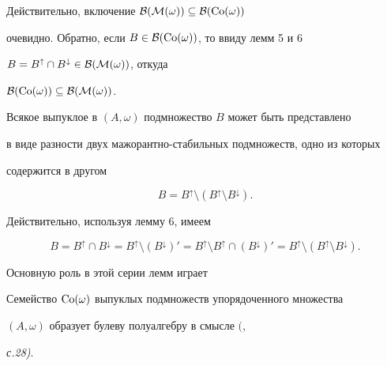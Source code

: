  


Действительно, включение $\cal B(M(\omega))\subseteq\cal B(\operatorname{Co}(\omega))$ 


очевидно. Обратно, если $B\in\cal B(\operatorname{Co}(\omega))$, то ввиду лемм 5 и 6\; 


$B=B^\uparrow\cap B^\downarrow\in\cal B(M(\omega))$, откуда 


$\cal B(\operatorname{Co}(\omega))\subseteq\cal B(M(\omega))$. 


 


\begin{cor} 


Всякое выпуклое в $(A,\omega)$ подмножество $B$ может быть представлено 


в виде разности двух мажорантно-стабильных подмножеств, одно из которых 


содержится в другом


\begin{equation} 


B=B^\uparrow\setminus(B^\uparrow\setminus 


B^\downarrow). 


\end{equation} 


\end{cor} 


 


Действительно, используя лемму 6, имеем 


$$ 


B=B^\uparrow\cap B^\downarrow= 


B^\uparrow\setminus(B^\downarrow)'= 


B^\uparrow\setminus B^\uparrow\cap (B^\downarrow)'= 


B^\uparrow\setminus(B^\uparrow\setminus B^\downarrow). 


$$ 


 


Основную роль в этой серии лемм играет 


 


\begin{lem} 


Семейство $\operatorname{Co}(\omega)$ выпуклых подмножеств упорядоченного множества 


$(A,\omega)$ образует булеву полуалгебру в смысле $($\cite{4}, 


{\em с.28)}. 


\end{lem} 



